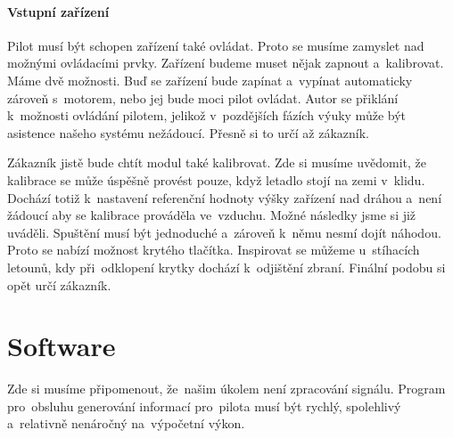 	\paragraph{Vstupní zařízení}		
		Pilot musí být schopen zařízení také ovládat. Proto se musíme zamyslet nad možnými ovládacími prvky.
		Zařízení budeme muset nějak zapnout a~kalibrovat. Máme dvě možnosti. Buď se zařízení bude zapínat a~vypínat automaticky zároveň s~motorem, nebo jej bude moci pilot ovládat. Autor se přiklání k~možnosti ovládání pilotem, jelikož v~pozdějších fázích výuky může být asistence našeho systému nežádoucí. Přesně si to určí až zákazník.\par
		Zákazník jistě bude chtít modul také kalibrovat. Zde si musíme uvědomit, že kalibrace se může úspěšně provést pouze, když letadlo stojí na zemi v~klidu. Dochází totiž k~nastavení referenční hodnoty výšky zařízení nad dráhou a~není žádoucí aby se kalibrace prováděla ve~vzduchu. Možné následky jsme si již uváděli. Spuštění musí být jednoduché a~zároveň k~němu nesmí dojít náhodou. Proto se nabízí možnost krytého tlačítka. Inspirovat se můžeme u~stíhacích letounů, kdy při~odklopení krytky dochází k~odjištění zbraní. Finální podobu si opět určí zákazník.
	
	\section{Software}\label{navrhReseni::software}
		Zde si musíme připomenout, že~našim úkolem není zpracování signálu. Program pro~obsluhu generování informací pro~pilota musí být rychlý, spolehlivý a~relativně nenáročný na~výpočetní výkon.
		
